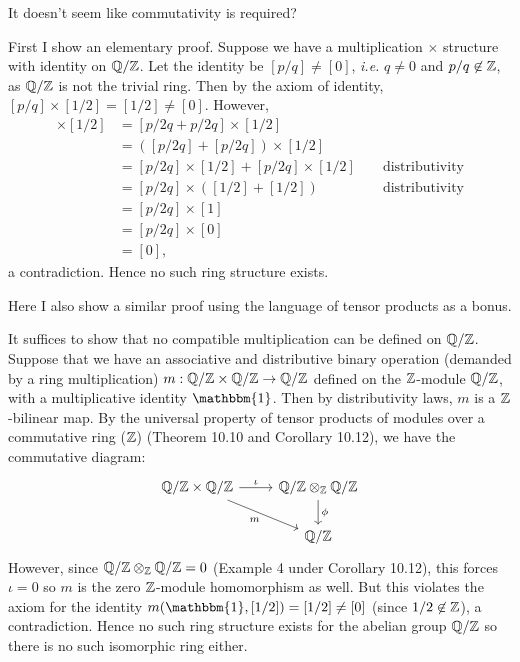\documentclass[12pt]{article}
\begin{document}
\begin{problem}[5]
	It doesn't seem like commutativity is required?

	First I show an elementary proof. Suppose we have a multiplication $ \times $ structure with identity on $ \mathbb{Q} / \mathbb{Z}$. Let the identity be $ [p /q] \neq [0]$, \emph{i.e.} $ q \neq 0$ and $p /q \not\in \mathbb{Z}$, as $ \mathbb{Q} /\mathbb{Z}$ is not the trivial ring. Then by the axiom of identity, $ [p /q] \times [1 /2] = [1 /2] \neq [0]$. However,
\begin{align*}
	[p /q] \times [1/2] &= [p /2q+ p /2q] \times [1 /2]\\
			    &= ([p /2q] + [p / 2q])\times [1 /2] \\
			    &= [p /2q] \times [1 /2] + [p /2q] \times [1 /2] && \text{ distributivity} \\
			    &= [p /2q] \times ([1 /2] + [1 /2]) && \text{ distributivity} \\
			    &= [p /2q] \times [1] \\
			    &= [p /2q] \times [0]\\
			    &= [0],
\end{align*}
a contradiction. Hence no such ring structure exists.

Here I also show a similar proof using the language of tensor products as a bonus.

	It suffices to show that no compatible multiplication can be defined on $ \mathbb{Q} / \mathbb{Z}$. Suppose that we have an associative and distributive binary operation (demanded by a ring multiplication) $ m: \mathbb{Q} / \mathbb{Z} \times \mathbb{Q} /\mathbb{Z} \to \mathbb{Q} / \mathbb{Z}$ defined on the $ \mathbb{Z}$-module $ \mathbb{Q} / \mathbb{Z}$, with a multiplicative identity $ \mathbbm{1}$. Then by distributivity laws, $ m$ is a $ \mathbb{Z}$-bilinear map. By the universal property of tensor products of modules over a commutative ring ($ \mathbb{Z}$) (Theorem 10.10 and Corollary 10.12), we have the commutative diagram:
\[\begin{tikzcd}
	{\mathbb{Q}/\mathbb{Z} \times \mathbb{Q}/\mathbb{Z}} & {\mathbb{Q}/\mathbb{Z} \otimes_\mathbb{Z} \mathbb{Q}/\mathbb{Z}} \\
	& {\mathbb{Q}/\mathbb{Z}}
	\arrow["\iota", from=1-1, to=1-2]
	\arrow["\phi", from=1-2, to=2-2]
	\arrow["m"', from=1-1, to=2-2]
\end{tikzcd}\]
However, since $ \mathbb{Q} / \mathbb{Z} \otimes _{\mathbb{Z}} \mathbb{Q} / \mathbb{Z} = 0$ (Example 4 under Corollary 10.12), this forces $ \iota = 0$ so $ m$ is the zero $ \mathbb{Z}$-module homomorphism as well. But this violates the axiom for the identity $ m(\mathbbm{1},[1 /2]) = [1/2] \neq [0]$ (since $ 1 / 2 \not\in  \mathbb{Z}$), a contradiction. Hence no such ring structure exists for the abelian group $ \mathbb{Q} / \mathbb{Z}$ so there is no such isomorphic ring either.
\end{problem}
\end{document}
